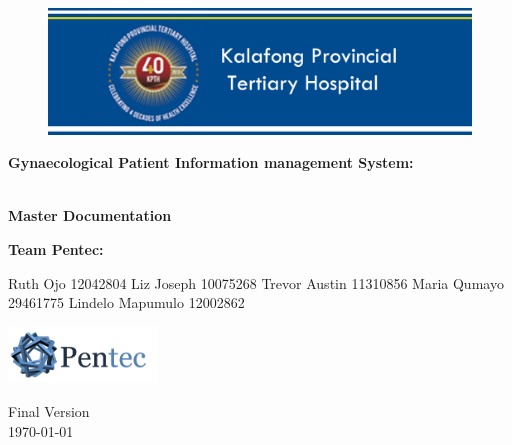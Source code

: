 \begin{titlepage}
	\begin{center}
		
		\begin{figure}[t]
			\centering
			\includegraphics[width=450px]{./Graphics/KPTH_Logo}
		\end{figure}		
		
		\textbf{\LARGE Gynaecological Patient Information
		management System:}
		
		\vspace{1 cm}
	    \textbf{\LARGE \\Master Documentation}
		
		\vspace{1 cm}
		\LARGE{\textbf{Team Pentec: }}
		

		\begin{flushright} \large
			
			Ruth Ojo 12042804\newline
			Liz Joseph 10075268\newline
			Trevor Austin 11310856\newline
			Maria Qumayo 29461775\newline
			Lindelo Mapumulo 12002862\newline
		\end{flushright}
		
				\vspace{1 cm}
				\centering
				\includegraphics[width=150px]{./Graphics/Pentec_Logo.png}

		
		
		{\LARGE Final Version}
		\\
		{\large \today}		
		
		
	\end{center}
\end{titlepage}
